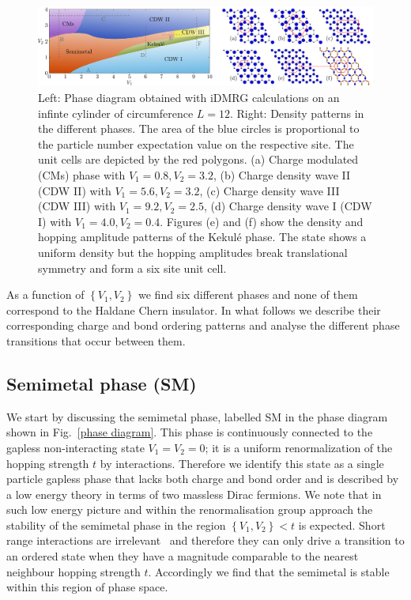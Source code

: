 \documentclass[aps,prx,10pt,twocolumn,floatfix,superscriptaddress,showpacs,numerical,footinbib]{revtex4-1}
\begin{document}
\begin{figure}
 \includegraphics[width=\textwidth]{pdf/phase_diagram_ext.pdf}
 \caption{Left: Phase diagram obtained with iDMRG calculations on an infinte cylinder of circumference $L=12$. Right: Density patterns in the different phases. The area of the blue circles is proportional to the particle number expectation value on the respective site. The unit cells are depicted by the red polygons. (a) Charge modulated (CMs) phase with $V_1 = 0.8, V_2 = 3.2 $, (b) Charge density wave II (CDW II) with $V_1 = 5.6, V_2 = 3.2$,  (c) Charge density wave III (CDW III) with $V_1 = 9.2, V_2 = 2.5$, (d) Charge density wave I (CDW I) with $V_1 = 4.0, V_2 = 0.4 $. Figures (e) and (f) show the density and hopping amplitude patterns of the Kekul\'e phase. The state shows a uniform density but the hopping amplitudes break translational symmetry and form a six site unit cell. \label{fig:phase diagram}}
\end{figure}

%
As a function of $\left\lbrace V_{1},V_{2}\right\rbrace$ we find six different phases and none of them correspond to the Haldane Chern insulator.
%
In what follows we describe their corresponding charge and bond ordering patterns and analyse the different phase transitions that occur between them.
%


%
\subsection{Semimetal phase (SM)}
%
We start by discussing the semimetal phase, labelled SM in the phase diagram shown in Fig.~\ref{phase diagram}.
%
This phase is continuously connected to the gapless non-interacting state $V_{1}=V_{2}=0$; 
it is a uniform renormalization of the hopping strength $t$ by interactions.
%
Therefore we identify this state as a single particle gapless phase that lacks both charge and bond order and is described by a low energy theory in terms of two massless Dirac fermions.
%
We note that in such low energy picture and within the renormalisation group approach the stability of the semimetal phase in the region $\left\lbrace V_{1},V_{2}\right\rbrace < t$ is expected.
%
Short range interactions are irrelevant~\cite{Shankar?} and therefore they can only drive a transition to an ordered state when they have a magnitude comparable to the nearest neighbour hopping strength $t$.
%
Accordingly we find that the semimetal is stable within this region of phase space.
\end{document}
